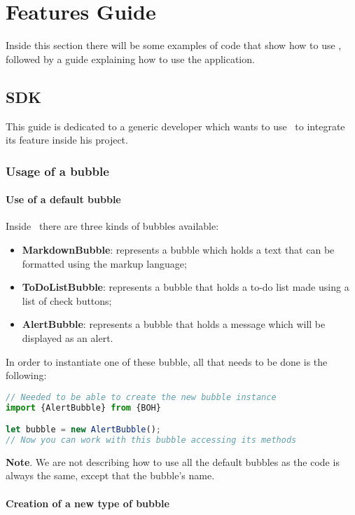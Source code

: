 \section{Features Guide}
Inside this section there will be some examples of code that show how to use \progettoShort, followed by a guide explaining how to use the \app application.

\subsection{SDK}
This guide is dedicated to a generic developer which wants to use \progettoShort\ to integrate its feature inside his  project. 

\subsubsection{Usage of a bubble}
\paragraph{Use of a default bubble}
Inside \progettoShort\ there are three kinds of bubbles available:
\begin{itemize}
	\item \textbf{MarkdownBubble}: represents a bubble which holds a text that can be formatted using the  markup language;
	\item \textbf{ToDoListBubble}: represents a bubble that holds a to-do list made using a list of check buttons;
	\item \textbf{AlertBubble}: represents a bubble that holds a message which will be displayed as an alert.
\end{itemize}


In order to instantiate one of these bubble, all that needs to be done is the following:
\begin{lstlisting}[language=JavaScript, frame=single]
// Needed to be able to create the new bubble instance
import {AlertBubble} from {BOH}

let bubble = new AlertBubble();
// Now you can work with this bubble accessing its methods
\end{lstlisting}

\textbf{Note}. We are not describing how to use all the default bubbles as the code is always the same, except that the bubble's name.

\paragraph{Creation of a new type of bubble}

